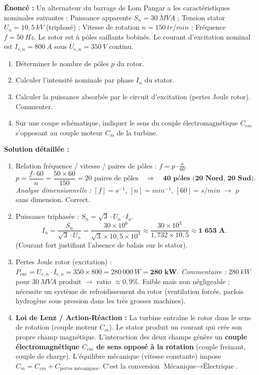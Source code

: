 \documentclass[11pt]{article}
\begin{document}
\begin{exoresolu}
\textbf{Énoncé :} Un alternateur du barrage de Lom Pangar a les caractéristiques nominales suivantes : Puissance apparente $S_n = 30\ \si{MVA}$ ; Tension stator $U_n = 10,5\ \si{kV}$ (triphasé) ; Vitesse de rotation $n = 150\ \si{tr/min}$ ; Fréquence $f = 50\ \si{Hz}$. Le rotor est à pôles saillants bobinés. Le courant d'excitation nominal est $I_{e,n} = 800\ \si{A}$ sous $U_{e,n} = 350\ \si{V}$ continu.
\begin{enumerate}
    \item Déterminer le nombre de pôles $p$ du rotor.
    \item Calculer l'intensité nominale par phase $I_n$ du stator.
    \item Calculer la puissance absorbée par le circuit d'excitation (pertes Joule rotor). Commenter.
    \item Sur une coupe schématique, indiquer le sens du couple électromagnétique $C_{em}$ s'opposant au couple moteur $C_m$ de la turbine.
\end{enumerate}
\tcblower
\textbf{Solution détaillée :}
\begin{enumerate}
    \item Relation fréquence / vitesse / paires de pôles : $f = p \cdot \frac{n}{60}$.
    \[ p = \frac{f \cdot 60}{n} = \frac{50 \times 60}{150} = 20 \text{ paires de pôles} \quad \Rightarrow \quad \textbf{40 pôles (20 Nord, 20 Sud)}. \]
    \textit{Analyse dimensionnelle :} $[f]=\si{s^{-1}}$, $[n]=\si{min^{-1}}$, $[60]=\si{s/min}$ $\rightarrow$ $p$ sans dimension. Correct.
    \item Puissance triphasée : $S_n = \sqrt{3} \cdot U_n \cdot I_n$.
    \[ I_n = \frac{S_n}{\sqrt{3} \cdot U_n} = \frac{30 \times 10^6}{\sqrt{3} \times 10,5 \times 10^3} \approx \frac{30 \times 10^3}{1,732 \times 10,5} \approx \textbf{1 653 A}. \]
    (Courant fort justifiant l'absence de balais sur le stator).
    \item Pertes Joule rotor (excitation) : $P_{\text{exc}} = U_{e,n} \cdot I_{e,n} = 350 \times 800 = 280\,000\ \si{W} = \textbf{280 kW}$.
    \textit{Commentaire :} $280\ \si{kW}$ pour $30\ \si{MVA}$ produit $\rightarrow$ ratio $\approx 0,9\%$. Faible mais non négligeable ; nécessite un système de refroidissement du rotor (ventilation forcée, parfois hydrogène sous pression dans les très grosses machines).
    \item \textbf{Loi de Lenz / Action-Réaction :} La turbine entraîne le rotor dans le sens de rotation (couple moteur $C_m$). Le stator produit un courant qui crée son propre champ magnétique. L'interaction des deux champs génère un \textbf{couple électromagnétique $C_{em}$ de sens opposé à la rotation} (couple freinant, couple de charge). L'équilibre mécanique (vitesse constante) impose $C_m = C_{em} + C_{\text{pertes mécaniques}}$. C'est la conversion $\text{Mécanique} \to \text{Électrique}$.
\end{enumerate}
\end{exoresolu}
\end{document}
